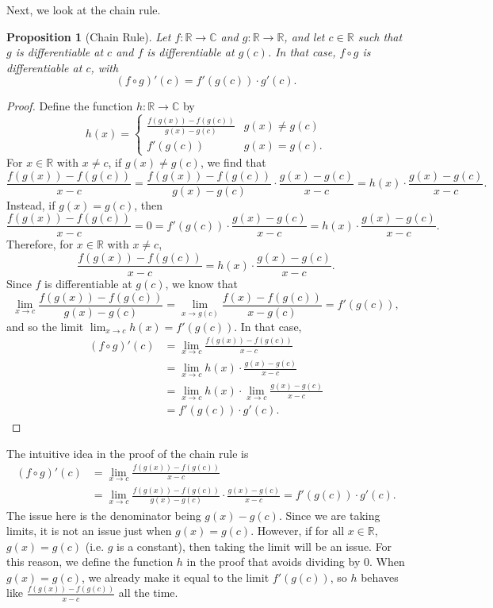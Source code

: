 \documentclass[a4paper, openany]{memoir}
\theoremstyle{definition}
\theoremstyle{plain}
\newtheorem{proposition}[definition]{Proposition}
\begin{document}
Next, we look at the chain rule.
\begin{proposition}[Chain Rule]
Let $f: \mathbb{R} \to \mathbb{C}$ and $g: \mathbb{R} \to \mathbb{R}$, and let $c \in \mathbb{R}$ such that $g$ is differentiable at $c$ and $f$ is differentiable at $g(c)$. In that case, $f \circ g$ is differentiable at $c$, with
\[(f \circ g)'(c) = f'(g(c)) \cdot g'(c).\]
\end{proposition}
\begin{proof}
Define the function $h: \mathbb{R} \to \mathbb{C}$ by
\[h(x) = \begin{cases}
\frac{f(g(x)) - f(g(c))}{g(x) - g(c)} & g(x) \neq g(c) \\
f'(g(c)) & g(x) = g(c).
\end{cases}\]
For $x \in \mathbb{R}$ with $x \neq c$, if $g(x) \neq g(c)$, we find that
\[\frac{f(g(x)) - f(g(c))}{x - c} = \frac{f(g(x)) - f(g(c))}{g(x) - g(c)} \cdot \frac{g(x) - g(c)}{x - c} = h(x) \cdot \frac{g(x) - g(c)}{x - c}.\]
Instead, if $g(x) = g(c)$, then
\[\frac{f(g(x)) - f(g(c))}{x - c} = 0 = f'(g(c)) \cdot \frac{g(x) - g(c)}{x - c} = h(x) \cdot \frac{g(x) - g(c)}{x - c}.\]
Therefore, for $x \in \mathbb{R}$ with $x \neq c$,
\[\frac{f(g(x)) - f(g(c))}{x - c} = h(x) \cdot \frac{g(x) - g(c)}{x - c}.\]
Since $f$ is differentiable at $g(c)$, we know that
\[\lim_{x \to c} \frac{f(g(x)) - f(g(c))}{g(x) - g(c)} = \lim_{x \to g(c)} \frac{f(x) - f(g(c))}{x - g(c)} = f'(g(c)),\]
and so the limit $\lim_{x \to c} h(x) = f'(g(c))$. In that case,
\begin{align*}
    (f \circ g)'(c) &= \lim_{x \to c} \frac{f(g(x)) - f(g(c))}{x - c} \\
    &= \lim_{x \to c} h(x) \cdot \frac{g(x) - g(c)}{x - c} \\
    &= \lim_{x \to c} h(x) \cdot \lim_{x \to c} \frac{g(x) - g(c)}{x - c} \\
    &= f'(g(c)) \cdot g'(c).
\end{align*}
\end{proof}
\noindent The intuitive idea in the proof of the chain rule is
\begin{align*}
    (f \circ g)'(c) &= \lim_{x \to c} \frac{f(g(x)) - f(g(c))}{x - c} \\
    &= \lim_{x \to c} \frac{f(g(x)) - f(g(c))}{g(x) - g(c)} \cdot \frac{g(x) - g(c)}{x - c} = f'(g(c)) \cdot g'(c).
\end{align*}
The issue here is the denominator being $g(x) - g(c)$. Since we are taking limits, it is not an issue just when $g(x) = g(c)$. However, if for all $x \in \mathbb{R}$, $g(x) = g(c)$ (i.e. $g$ is a constant), then taking the limit will be an issue. For this reason, we define the function $h$ in the proof that avoids dividing by 0. When $g(x) = g(c)$, we already make it equal to the limit $f'(g(c))$, so $h$ behaves like $\frac{f(g(x)) - f(g(c))}{x - c}$ all the time.
\end{document}
